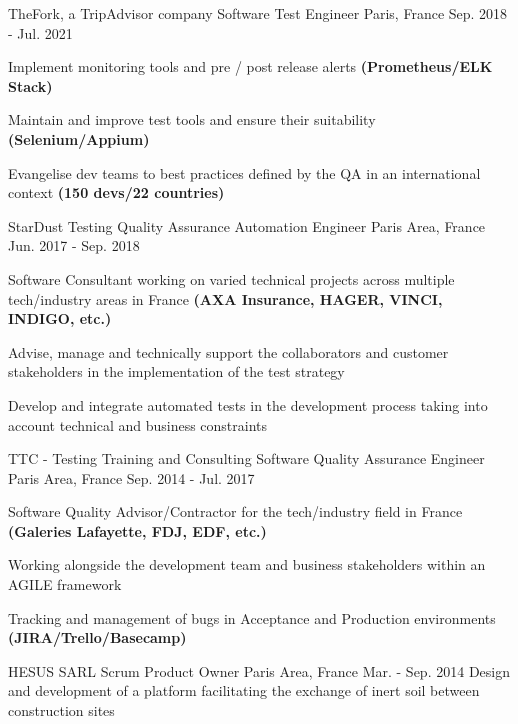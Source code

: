\begin{cventries}
  \cventry
  {TheFork, a TripAdvisor company }
  {Software Test Engineer}
  {Paris, France}
  {Sep. 2018 - Jul. 2021}
  {
    \begin{cvitems}
      \item{Implement monitoring tools and pre / post release alerts \textbf{(Prometheus/ELK Stack)}}
      \item{Maintain and improve test tools and ensure their suitability \textbf{(Selenium/Appium)}}
      \item{Evangelise dev teams to best practices defined by the QA in an international context \textbf{(150 devs/22 countries)}}
    \end{cvitems}
    \vspace{0.75em}
  }

  \cventry
  {StarDust Testing }
  {Quality Assurance Automation Engineer}
  {Paris Area, France}
  {Jun. 2017 - Sep. 2018}
  {
    \begin{cvitems}
      \item{Software Consultant working on varied technical projects across multiple tech/industry areas in France \textbf{(AXA Insurance, HAGER, VINCI, INDIGO, etc.)}}
      \item{Advise, manage and technically support the collaborators and customer stakeholders in the implementation of the test strategy}
      \item{Develop and integrate automated tests in the development process taking into account technical and business constraints}
    \end{cvitems}
    \vspace{0.75em}
  }

  \cventry
  {TTC - Testing Training and Consulting }
  {Software Quality Assurance Engineer}
  {Paris Area, France}
  {Sep. 2014 - Jul. 2017}
  {
    \begin{cvitems}
      \item{Software Quality Advisor/Contractor for the tech/industry field in France \textbf{(Galeries Lafayette, FDJ, EDF, etc.)}}
      \item{Working alongside the development team and business stakeholders within an AGILE framework}
      \item {Tracking and management of bugs in Acceptance and Production environments \textbf{(JIRA/Trello/Basecamp)}}
    \end{cvitems}
    \vspace{0.75em}
  }

  \cventry
  {HESUS SARL }
  {Scrum Product Owner}
  {Paris Area, France}
  {Mar. - Sep. 2014}
  {Design and development of a platform facilitating the exchange of inert soil between construction sites \vspace{0.75em}}

\end{cventries}
